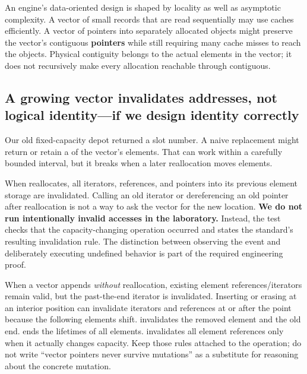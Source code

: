 An engine's data-oriented design is shaped by locality as well as asymptotic complexity. A vector of small records that are read sequentially may use caches efficiently. A vector of pointers into separately allocated objects might preserve the vector's contiguous \textbf{pointers} while still requiring many cache misses to reach the objects. Physical contiguity belongs to the actual  elements in the vector; it does not recursively make every allocation reachable through  contiguous.

\subsection{A growing vector invalidates addresses, not logical identity---if we design identity correctly}\label{01-foundations-i-ch006-a-growing-vector-invalidates-addresses-not-logical-identityif-we-design-identity-correctly}

\hypertarget{01-foundations-i-ch006-a-growing-vector-invalidates-addresses-not-logical-identityif-we-design-identity-correctly}{}

Our old fixed-capacity depot returned a slot number. A naive replacement might return  or retain a  of the vector's elements. That can work within a carefully bounded interval, but it breaks when a later reallocation moves elements.

When  reallocates, all iterators, references, and pointers into its previous element storage are invalidated. Calling an old iterator or dereferencing an old pointer after reallocation is not a way to ask the vector for the new location. \textbf{We do not run intentionally invalid accesses in the laboratory.} Instead, the test checks that the capacity-changing operation occurred and states the standard's resulting invalidation rule. The distinction between observing the event and deliberately executing undefined behavior is part of the required engineering proof.

When a vector appends \emph{without} reallocation, existing element references/iterators remain valid, but the past-the-end iterator is invalidated. Inserting or erasing at an interior position can invalidate iterators and references at or after the point because the following elements shift.  invalidates the removed element and the old end.  ends the lifetimes of all elements.  invalidates all element references only when it actually changes capacity. Keep those rules attached to the operation; do not write ``vector pointers never survive mutations'' as a substitute for reasoning about the concrete mutation.

